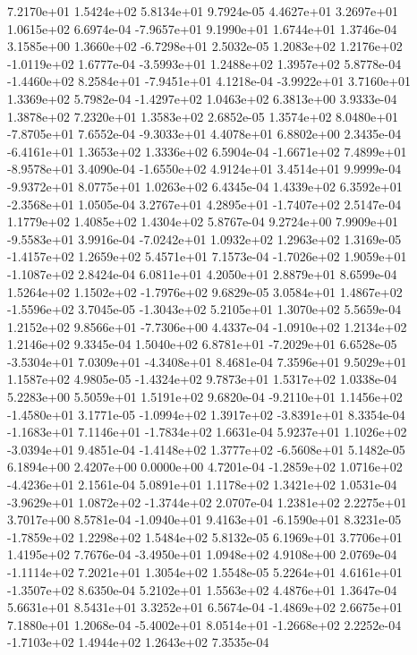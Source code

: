 7.2170e+01 1.5424e+02 5.8134e+01  9.7924e-05
4.4627e+01 3.2697e+01 1.0615e+02  6.6974e-04
-7.9657e+01  9.1990e+01  1.6744e+01  1.3746e-04
 3.1585e+00  1.3660e+02 -6.7298e+01  2.5032e-05
 1.2083e+02  1.2176e+02 -1.0119e+02  1.6777e-04
-3.5993e+01  1.2488e+02  1.3957e+02  5.8778e-04
-1.4460e+02  8.2584e+01 -7.9451e+01  4.1218e-04
-3.9922e+01  3.7160e+01  1.3369e+02  5.7982e-04
-1.4297e+02  1.0463e+02  6.3813e+00  3.9333e-04
1.3878e+02 7.2320e+01 1.3583e+02  2.6852e-05
 1.3574e+02  8.0480e+01 -7.8705e+01  7.6552e-04
-9.3033e+01  4.4078e+01  6.8802e+00  2.3435e-04
-6.4161e+01  1.3653e+02  1.3336e+02  6.5904e-04
-1.6671e+02  7.4899e+01 -8.9578e+01  3.4090e-04
-1.6550e+02  4.9124e+01  3.4514e+01  9.9999e-04
-9.9372e+01  8.0775e+01  1.0263e+02  6.4345e-04
 1.4339e+02  6.3592e+01 -2.3568e+01  1.0505e-04
 3.2767e+01  4.2895e+01 -1.7407e+02  2.5147e-04
1.1779e+02 1.4085e+02 1.4304e+02  5.8767e-04
 9.2724e+00  7.9909e+01 -9.5583e+01  3.9916e-04
-7.0242e+01  1.0932e+02  1.2963e+02  1.3169e-05
-1.4157e+02  1.2659e+02  5.4571e+01  7.1573e-04
-1.7026e+02  1.9059e+01 -1.1087e+02  2.8424e-04
6.0811e+01 4.2050e+01 2.8879e+01  8.6599e-04
 1.5264e+02  1.1502e+02 -1.7976e+02  9.6829e-05
 3.0584e+01  1.4867e+02 -1.5596e+02  3.7045e-05
-1.3043e+02  5.2105e+01  1.3070e+02  5.5659e-04
 1.2152e+02  9.8566e+01 -7.7306e+00  4.4337e-04
-1.0910e+02  1.2134e+02  1.2146e+02  9.3345e-04
 1.5040e+02  6.8781e+01 -7.2029e+01  6.6528e-05
-3.5304e+01  7.0309e+01 -4.3408e+01  8.4681e-04
7.3596e+01 9.5029e+01 1.1587e+02  4.9805e-05
-1.4324e+02  9.7873e+01  1.5317e+02  1.0338e-04
5.2283e+00 5.5059e+01 1.5191e+02  9.6820e-04
-9.2110e+01  1.1456e+02 -1.4580e+01  3.1771e-05
-1.0994e+02  1.3917e+02 -3.8391e+01  8.3354e-04
-1.1683e+01  7.1146e+01 -1.7834e+02  1.6631e-04
 5.9237e+01  1.1026e+02 -3.0394e+01  9.4851e-04
-1.4148e+02  1.3777e+02 -6.5608e+01  5.1482e-05
6.1894e+00 2.4207e+00 0.0000e+00  4.7201e-04
-1.2859e+02  1.0716e+02 -4.4236e+01  2.1561e-04
5.0891e+01 1.1178e+02 1.3421e+02  1.0531e-04
-3.9629e+01  1.0872e+02 -1.3744e+02  2.0707e-04
1.2381e+02 2.2275e+01 3.7017e+00  8.5781e-04
-1.0940e+01  9.4163e+01 -6.1590e+01  8.3231e-05
-1.7859e+02  1.2298e+02  1.5484e+02  5.8132e-05
6.1969e+01 3.7706e+01 1.4195e+02  7.7676e-04
-3.4950e+01  1.0948e+02  4.9108e+00  2.0769e-04
-1.1114e+02  7.2021e+01  1.3054e+02  1.5548e-05
 5.2264e+01  4.6161e+01 -1.3507e+02  8.6350e-04
5.2102e+01 1.5563e+02 4.4876e+01  1.3647e-04
5.6631e+01 8.5431e+01 3.3252e+01  6.5674e-04
-1.4869e+02  2.6675e+01  7.1880e+01  1.2068e-04
-5.4002e+01  8.0514e+01 -1.2668e+02  2.2252e-04
-1.7103e+02  1.4944e+02  1.2643e+02  7.3535e-04
